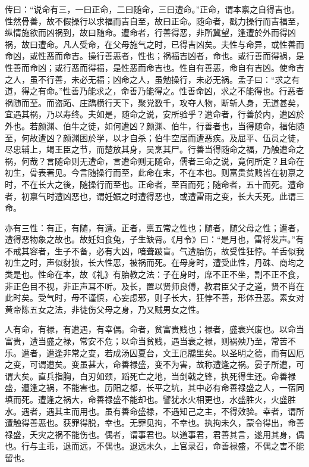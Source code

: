 \documentclass[]{article}
\begin{document}
传曰：``说命有三，一曰正命，二曰随命，三曰遭命。''正命，谓本禀之自得吉也。性然骨善，故不假操行以求福而吉自至，故曰正命。随命者，戳力操行而吉福至，纵情施欲而凶祸到，故曰随命。遭命者，行善得恶，非所冀望，逢遭於外而得凶祸，故曰遭命。凡人受命，在父母施气之时，已得吉凶矣。夫性与命异，或性善而命凶，或性恶而命吉。操行善恶者，性也；祸福吉凶者，命也。或行善而得祸，是性善而命凶；或行恶而得福，是性恶而命吉也。性自有善恶，命自有吉凶。使命吉之人，虽不行善，未必无福；凶命之人，虽勉操行，未必无祸。孟子曰：``求之有道，得之有命。''性善乃能求之，命善乃能得之。性善命凶，求之不能得也。行恶者祸随而至。而盗跖、庄蹻横行天下，聚党数千，攻夺人物，断斩人身，无道甚矣，宜遇其祸，乃以寿终。夫如是，随命之说，安所验乎？遭命者，行善於内，遭凶於外也。若颜渊、伯牛之徒，如何遭凶？颜渊、伯牛，行善者也，当得随命，福佑随至，何故遭凶？颜渊困於学，以才自杀；伯牛空居而遭恶疾。及屈平、伍员之徒，尽忠辅上，竭王臣之节，而楚放其身，吴烹其尸。行善当得随命之福，乃触遭命之祸，何哉？言随命则无遭命，言遭命则无随命，儒者三命之说，竟何所定？且命在初生，骨表著见。今言随操行而至，此命在末，不在本也。则富贵贫贱皆在初禀之时，不在长大之後，随操行而至也。正命者，至百而死；随命者，五十而死。遭命者，初禀气时遭凶恶也，谓妊娠之时遭得恶也，或遭雷雨之变，长大夭死。此谓三命。

亦有三性：有正，有随，有遭。正者，禀五常之性也；随者，随父母之性；遭者，遭得恶物象之故也。故妊妇食兔，子生缺脣。《月令》曰：``是月也，雷将发声。''有不戒其容者，生子不备，必有大凶，喑聋跛盲。气遭胎伤，故受性狂悖。羊舌似我初生之时，声似豺狼，长大性恶，被祸而死。在母身时，遭受此性，丹硃、商均之类是也。性命在本，故《礼》有胎教之法：子在身时，席不正不坐，割不正不食，非正色目不视，非正声耳不听。及长，置以贤师良傅，教君臣父子之道，贤不肖在此时矣。受气时，母不谨慎，心妄虑邪，则子长大，狂悖不善，形体丑恶。素女对黄帝陈五女之法，非徒伤父母之身，乃又贼男女之性。

人有命，有禄，有遭遇，有幸偶。命者，贫富贵贱也；禄者，盛衰兴废也。以命当富贵，遭当盛之禄，常安不危；以命当贫贱，遇当衰之禄，则祸殃乃至，常苦不乐。遭者，遭逢非常之变，若成汤囚夏台，文王厄牖里矣。以圣明之德，而有囚厄之变，可谓遭矣。变虽甚大，命善禄盛，变不为害，故称遭逢之祸。晏子所遭，可谓大矣。直兵指胸，白刃如颈，蹈死亡之地，当剑戟之锋，执死得生还。命善禄盛，遭逢之祸，不能害也。历阳之都，长平之坑，其中必有命善禄盛之人，一宿同填而死。遭逢之祸大，命善禄盛不能却也。譬犹水火相更也，水盛胜火，火盛胜水。遇者，遇其主而用也。虽有善命盛禄，不遇知己之主，不得效验。幸者，谓所遭触得善恶也。获罪得脱，幸也。无罪见拘，不幸也。执拘未久，蒙令得出，命善禄盛，夭灾之祸不能伤也。偶者，谓事君也。以道事君，君善其言，遂用其身，偶也。行与主乖，退而远，不偶也。退远未久，上官录召，命善禄盛，不偶之害不能留也。
\end{document}
